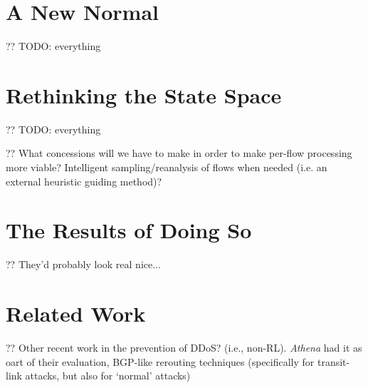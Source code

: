 \documentclass[conference, letterpaper, 10pt, times]{IEEEtran}
\begin{document}
%

\section{A New Normal}

?? TODO: everything

\section{Rethinking the State Space}

?? TODO: everything

?? What concessions will we have to make in order to make per-flow processing more viable? Intelligent sampling/reanalysis of flows when needed (i.e. an external heuristic guiding method)?

\section{The Results of Doing So}

?? They'd probably look real nice...

\section{Related Work}

?? Other recent work in the prevention of DDoS? (i.e., non-RL).
\emph{Athena} \cite{DBLP:conf/dsn/LeeKSPY17} had it as oart of their evaluation, BGP-like rerouting techniques (specifically for transit-link attacks, but also for `normal' attacks) \cite{RoutingAroundCongestion}
\end{document}
